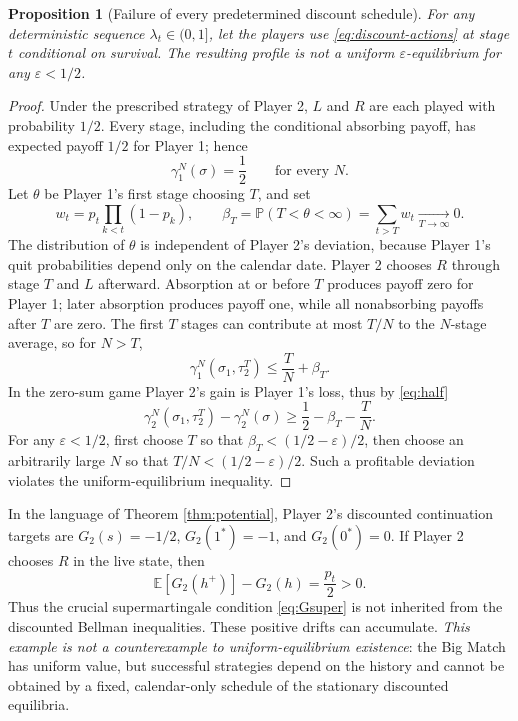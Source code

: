 \documentclass[11pt,a4paper]{article}
\newtheorem{proposition}[theorem]{Proposition}
\theoremstyle{definition}
\theoremstyle{remark}
\newcommand{\E}{\mathbb{E}}
\newcommand{\Prb}{\mathbb{P}}
\begin{document}
\begin{proposition}[Failure of every predetermined discount schedule]\label{prop:bigmatch}
For \emph{any} deterministic sequence $\lambda_t\in(0,1]$, let the players use \eqref{eq:discount-actions} at stage $t$ conditional on survival. The resulting profile is not a uniform $\varepsilon$-equilibrium for any $\varepsilon<1/2$.
\end{proposition}
\begin{proof}
Under the prescribed strategy of Player 2, $L$ and $R$ are each played with probability $1/2$. Every stage, including the conditional absorbing payoff, has expected payoff $1/2$ for Player 1; hence
\begin{equation}\label{eq:half}
\gamma_1^N(\sigma)=\frac12\qquad\text{for every }N.
\end{equation}
Let $\theta$ be Player 1's first stage choosing $T$, and set
\[
w_t=p_t\prod_{k<t}(1-p_k),\qquad
\beta_T=\Prb(T<\theta<\infty)=\sum_{t>T}w_t\xrightarrow[T\to\infty]{}0.
\]
The distribution of $\theta$ is independent of Player 2's deviation, because Player 1's quit probabilities depend only on the calendar date. Player 2 chooses $R$ through stage $T$ and $L$ afterward. Absorption at or before $T$ produces payoff zero for Player 1; later absorption produces payoff one, while all nonabsorbing payoffs after $T$ are zero. The first $T$ stages can contribute at most $T/N$ to the $N$-stage average, so for $N>T$,
\[
\gamma_1^N(\sigma_1,\tau_2^T)\le\frac{T}{N}+\beta_T.
\]
In the zero-sum game Player 2's gain is Player 1's loss, thus by \eqref{eq:half}
\[
\gamma_2^N(\sigma_1,\tau_2^T)-\gamma_2^N(\sigma)
\ge\frac12-\beta_T-\frac{T}{N}.
\]
For any $\varepsilon<1/2$, first choose $T$ so that $\beta_T<(1/2-\varepsilon)/2$, then choose an arbitrarily large $N$ so that $T/N<(1/2-\varepsilon)/2$. Such a profitable deviation violates the uniform-equilibrium inequality.
\end{proof}

In the language of Theorem \ref{thm:potential}, Player 2's discounted continuation targets are $G_2(s)=-1/2$, $G_2(1^*)=-1$, and $G_2(0^*)=0$. If Player 2 chooses $R$ in the live state, then
\[
\E[G_2(h^+)]-G_2(h)=\frac{p_t}{2}>0.
\]
Thus the crucial supermartingale condition \eqref{eq:Gsuper} is not inherited from the discounted Bellman inequalities. These positive drifts can accumulate. \emph{This example is not a counterexample to uniform-equilibrium existence}: the Big Match has uniform value, but successful strategies depend on the history and cannot be obtained by a fixed, calendar-only schedule of the stationary discounted equilibria.
\end{document}
